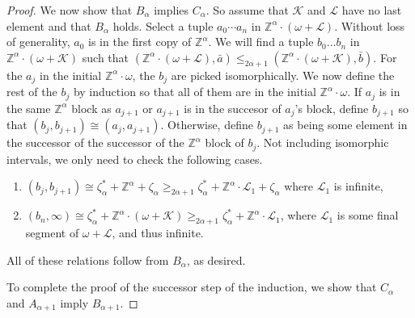 \documentclass[10pt,a4paper]{amsart}
\newcommand{\K}{\mathcal{K}}
\renewcommand{\L}{\mathcal{L}}
\newcommand{\Z}{\mathbb{Z}}
\providecommand{\ba}{\bar a}
\providecommand{\bb}{\bar b}
\begin{document}
\begin{proof}
We now show that $B_\alpha$ implies $C_\alpha$. So assume that $\K$ and $\L$ have
no last element and that $B_\alpha$ holds. 
Select a tuple $a_0\cdots  a_n$ in $\Z^\alpha\cdot(\omega+\L)$.
Without loss of generality, $a_0$ is in the first copy of $\Z^\alpha$. We will
find a tuple $b_0\dots b_n$ in $\Z^\alpha\cdot(\omega+\K)$ such that
$(\Z^\alpha\cdot (\omega+\L),\ba)\leq_{2\alpha+1}
(\Z^\alpha\cdot(\omega+\K),\bb)$. For the $a_j$ in the initial $\Z^\alpha\cdot\omega$, the $b_j$ are picked isomorphically. 
We now define the rest of the $b_j$ by induction so that all of them are in the initial $\Z^\alpha\cdot\omega$.
If $a_j$ is in the same $\Z^\alpha$ block as $a_{j+1}$ or $a_{j+1}$ is in the
succesor of $a_j$'s block, define $b_{j+1}$ so that
$(b_j,b_{j+1})\cong (a_j,a_{j+1})$.
Otherwise, define $b_{j+1}$ as being some element in the successor of the
successor of the $\Z^\alpha$ block of $b_j$. 
Not including isomorphic intervals, we only need to check the following cases. 
\begin{enumerate}
    \item $(b_j,b_{j+1})\cong\zeta^*_\alpha +\Z^\alpha+\zeta_\alpha \geq_{2\alpha+1} \zeta^*_\alpha
    +\Z^\alpha\cdot \L_1+\zeta_\alpha$ where $\L_1$ is infinite, 
\item $(b_n,\infty)\cong\zeta^*_\alpha +\Z^\alpha\cdot (\omega+\K) \geq_{2\alpha+1}
    \zeta^*_\alpha +\Z^\alpha\cdot \L_1$, where $\L_1$ is some final segment of
    $\omega+\L$, and thus infinite.
\end{enumerate} 
All of these relations follow from $B_\alpha$, as desired.

To complete the proof of the successor step of the induction, we show that
$C_\alpha$ and $A_{\alpha+1}$ imply $B_{\alpha+1}$.


\end{proof}
\end{document}
